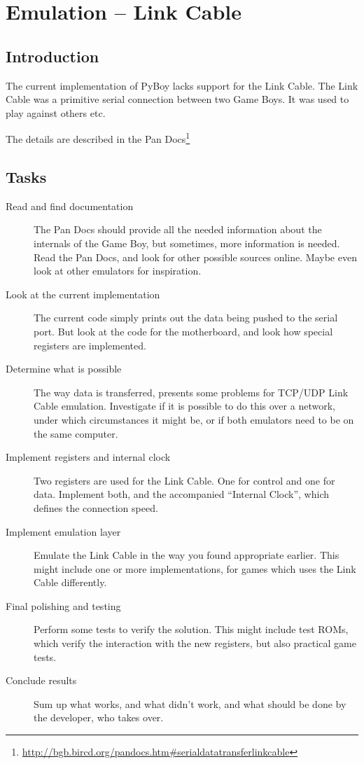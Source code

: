 \documentclass[11pt]{report} %
\begin{document}
\chapter*{Emulation -- Link Cable}
\section*{Introduction}
The current implementation of PyBoy lacks support for the Link Cable. The Link Cable was a primitive serial connection between two Game Boys. It was used to play against others etc.

The details are described in the Pan Docs\footnote{\url{http://bgb.bircd.org/pandocs.htm#serialdatatransferlinkcable}}

\section*{Tasks}
\begin{description}
    \item [Read and find documentation]
        The Pan Docs should provide all the needed information about the internals of the Game Boy, but sometimes, more information is needed. Read the Pan Docs, and look for other possible sources online. Maybe even look at other emulators for inspiration.

    \item [Look at the current implementation]
        The current code simply prints out the data being pushed to the serial port. But look at the code for the motherboard, and look how special registers are implemented.

    \item [Determine what is possible]
        The way data is transferred, presents some problems for TCP/UDP Link Cable emulation. Investigate if it is possible to do this over a network, under which circumstances it might be, or if both emulators need to be on the same computer.

    \item [Implement registers and internal clock]
        Two registers are used for the Link Cable. One for control and one for data. Implement both, and the accompanied ``Internal Clock'', which defines the connection speed.

    \item [Implement emulation layer]
        Emulate the Link Cable in the way you found appropriate earlier. This might include one or more implementations, for games which uses the Link Cable differently.

    \item [Final polishing and testing]
        Perform some tests to verify the solution. This might include test ROMs, which verify the interaction with the new registers, but also practical game tests.

    \item [Conclude results]
        Sum up what works, and what didn't work, and what should be done by the developer, who takes over.

\end{description}
\end{document}
